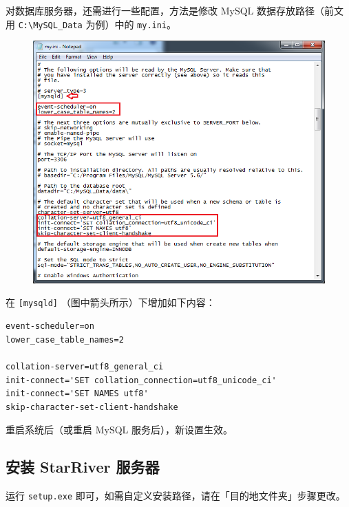 对数据库服务器，还需进行一些配置，方法是修改 MySQL 数据存放路径（前文用
\texttt{C:\textbackslash{}MySQL\_Data} 为例）中的 \texttt{my.ini}。

\begin{figure}[htbp]
\centering
\includegraphics{img/my_ini.png}
\end{figure}

在 \texttt{{[}mysqld{]}} （图中箭头所示）下增加如下内容：

\begin{verbatim}
event-scheduler=on
lower_case_table_names=2

collation-server=utf8_general_ci
init-connect='SET collation_connection=utf8_unicode_ci'
init-connect='SET NAMES utf8'
skip-character-set-client-handshake
\end{verbatim}

重启系统后（或重启 MySQL 服务后），新设置生效。

\subsection{安装 StarRiver
服务器}\label{ux5b89ux88c5-starriver-ux670dux52a1ux5668}

运行 \texttt{setup.exe}
即可，如需自定义安装路径，请在「目的地文件夹」步骤更改。

